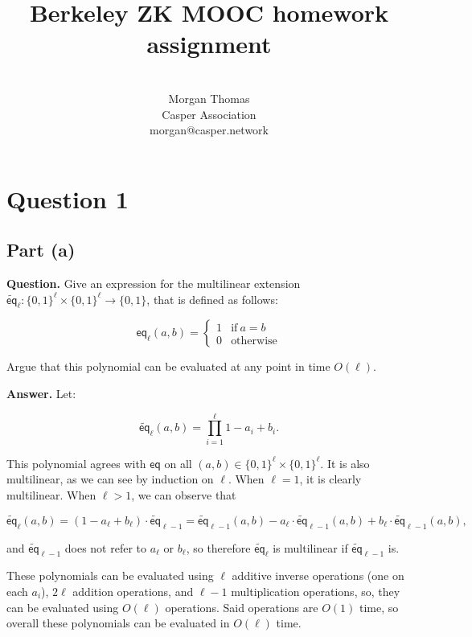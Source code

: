 \documentclass[11pt]{article}
\title{Berkeley ZK MOOC homework assignment}
\author{ \\ Morgan Thomas \\ Casper Association \\ morgan@casper.network }
\begin{document}
\maketitle

\section{Question 1}

\subsection{Part (a)}

\textbf{Question.} Give an expression for the multilinear extension
$\widetilde{\mathsf{eq}}_\ell : \{0,1\}^\ell \times \{0,1\}^\ell \to \{0,1\}$, that is defined
as follows:

\begin{equation}
  \mathsf{eq}_\ell(a, b) = \begin{cases}
	  1 & \text{if}\ a = b \\
	  0 & \text{otherwise}
  \end{cases}
\end{equation}

Argue that this polynomial can be evaluated at any point in time $O(\ell)$.

\textbf{Answer.} Let:

\begin{equation}
	\widetilde{\mathsf{eq}}_\ell(a,b) = \prod_{i=1}^\ell 1 - a_i + b_i.
\end{equation}

This polynomial agrees with $\mathsf{eq}$ on all
$(a,b) \in \{0,1\}^\ell \times \{0,1\}^\ell$. It is also multilinear,
as we can see by induction on $\ell$. When $\ell = 1$, it is clearly
multilinear. When $\ell > 1$, we can observe that

\begin{equation}
	\widetilde{\mathsf{eq}}_\ell(a,b) = (1 - a_\ell + b_\ell) \cdot \widetilde{\mathsf{eq}}_{\ell-1} = \widetilde{\mathsf{eq}}_{\ell-1}(a,b) - a_\ell \cdot \widetilde{\mathsf{eq}}_{\ell-1}(a,b) + b_\ell \cdot \widetilde{\mathsf{eq}}_{\ell-1}(a,b),
\end{equation}

and $\widetilde{\mathsf{eq}}_{\ell-1}$ does not refer to $a_\ell$ or $b_\ell$, so
therefore $\widetilde{\mathsf{eq}}_\ell$ is multilinear if $\widetilde{\mathsf{eq}}_{\ell-1}$ is.

These polynomials can be evaluated using $\ell$ additive inverse operations (one on each $a_i$), $2\ell$ addition operations, and $\ell-1$ multiplication operations, so, they can be evaluated using $O(\ell)$ operations. Said operations are $O(1)$ time, so overall these polynomials can be evaluated in $O(\ell)$ time.
\end{document}
